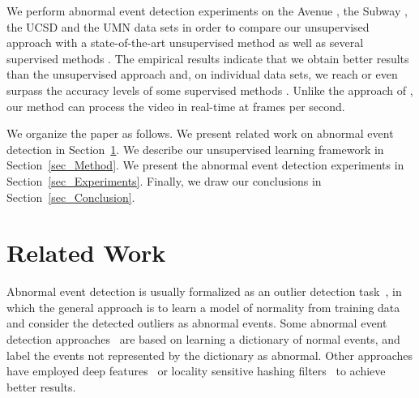 \documentclass[10pt,twocolumn,letterpaper]{article}
\begin{document}
We perform abnormal event detection experiments on the Avenue \cite{Lu-ICCV-2013}, the Subway \cite{Adam-PAMI-2008}, the UCSD \cite{Mahadevan-CVPR-2010} and the UMN \cite{Mehran-CVPR-2009} data sets in order to compare our unsupervised approach with a state-of-the-art unsupervised method \cite{Giorno-ECCV-2016} as well as several supervised methods \cite{Cong-CVPR-2011,Kim-CVPR-2009,Lu-ICCV-2013,Mahadevan-CVPR-2010,Mehran-CVPR-2009,Ren-BMVC-2015,Saligrama-CVPR-2012,Sun-PR-2017,Xu-BMVC-2015,Zhang-PR-2016}. The empirical results indicate that we obtain better results than the unsupervised approach \cite{Giorno-ECCV-2016} and, on individual data sets, we reach or even surpass the accuracy levels of some supervised methods \cite{Cong-CVPR-2011,Kim-CVPR-2009,Lu-ICCV-2013,Mehran-CVPR-2009}. Unlike the approach of \cite{Giorno-ECCV-2016}, our method can process the video in real-time at  frames per second.

We organize the paper as follows. We present related work on abnormal event detection in Section~\ref{sec_RelatedWork}. We describe our unsupervised learning framework in Section~\ref{sec_Method}. We present the abnormal event detection experiments in Section~\ref{sec_Experiments}. Finally, we draw our conclusions in Section~\ref{sec_Conclusion}.

\section{Related Work}
\label{sec_RelatedWork}

Abnormal event detection is usually formalized as an outlier detection task~\cite{Antic-ICCV-2011,Cheng-CVPR-2015,Cong-CVPR-2011,Dutta-AAAI-2015,Kim-CVPR-2009,Li-PAMI-2014,Lu-ICCV-2013,Mahadevan-CVPR-2010,Mehran-CVPR-2009,Ren-BMVC-2015,Sun-PR-2017,Xu-BMVC-2015,Zhang-PR-2016,Zhao-CVPR-2011}, in which the general approach is to learn a model of normality from training data and consider the detected outliers as abnormal events. Some abnormal event detection approaches~\cite{Cheng-CVPR-2015,Cong-CVPR-2011,Dutta-AAAI-2015,Lu-ICCV-2013,Ren-BMVC-2015} are based on learning a dictionary of normal events, and label the events not represented by the dictionary as abnormal. Other approaches have employed deep features~\cite{Xu-BMVC-2015} or locality sensitive hashing filters~\cite{Zhang-PR-2016} to achieve better results.
\end{document}
